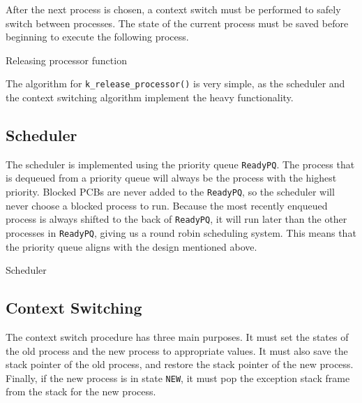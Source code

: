 \documentclass[12pt]{report}
\begin{document}
After the next process is chosen, a context switch must be performed to safely switch between processes.  The state of the current process must be saved before beginning to execute the following process.

\begin{algorithm}[H]
  \caption{Releasing processor function}
  \begin{algorithmic}[1]
    \EndProcedure
  \end{algorithmic}
\end{algorithm}

The algorithm for \texttt{k\_release\_processor()} is very simple, as the scheduler and the context switching algorithm implement the heavy functionality.

\subsection{Scheduler}
The scheduler is implemented using the priority queue \texttt{ReadyPQ}.  The process that is dequeued from a priority queue will always be the process with the highest priority.  Blocked PCBs are never added to the \texttt{ReadyPQ}, so the scheduler will never choose a blocked process to run.  Because the most recently enqueued process is always shifted to the back of \texttt{ReadyPQ}, it will run later than the other processes in \texttt{ReadyPQ}, giving us a round robin scheduling system.  This means that the priority queue aligns with the design mentioned above.

\begin{algorithm}[H]
  \caption{Scheduler}
  \begin{algorithmic}[1]
		\EndIf
		\EndIf
      \EndIf
    \EndProcedure
  \end{algorithmic}
\end{algorithm}

\subsection{Context Switching}
The context switch procedure has three main purposes.  It must set the states of the old process and the new process to appropriate values.  It must also save the stack pointer of the old process, and restore the stack pointer of the new process.  Finally, if the new process is in state \texttt{NEW}, it must pop the exception stack frame from the stack for the new process.
\end{document}

